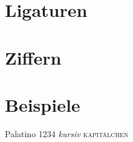 \section{Ligaturen}



\section{Ziffern}
\label{sec:Ziffern}


\section{Beispiele}

{\selectfont Palatino 1234 \emph{kursiv} \textsc{kapitälchen}}


